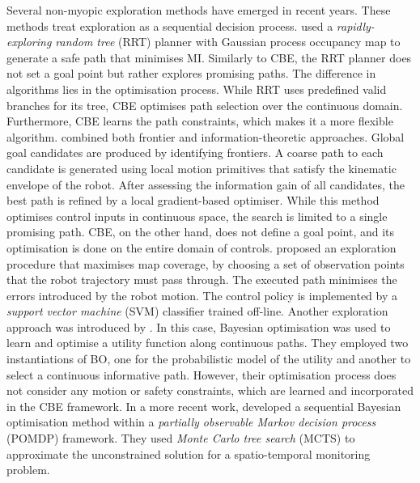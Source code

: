 \documentclass[shortAfour,sageh,times]{sagej_no_sage}
\begin{document}
Several non-myopic exploration methods have emerged in recent years. These methods treat exploration as a sequential decision process. 
\citet{Yang2013} used a \textit{rapidly-exploring random tree} (RRT) planner with Gaussian process occupancy map to generate a safe path that minimises 
MI. Similarly to CBE, the RRT planner does not set a goal point but rather explores promising paths. The difference in algorithms lies in the optimisation process. While RRT uses predefined valid branches for its tree, CBE optimises path selection over the continuous domain. Furthermore, CBE learns the path constraints, which makes it a more flexible algorithm. \citet{Charrow-RSS-15} combined both frontier and information-theoretic approaches. Global goal candidates are produced 
by identifying frontiers. A coarse path to each candidate is generated using local motion primitives that satisfy the kinematic envelope of 
the robot. After assessing the information gain of all candidates, the best path is refined by a local gradient-based optimiser. While this method optimises control inputs in continuous space, the search is limited to a single promising path. CBE, on the other hand, does not define a goal point, and its optimisation is done on the entire domain of controls. \citet{Kollar2008} proposed an exploration procedure that maximises map coverage, by choosing a set of observation points that the robot trajectory 
must pass through. The executed path minimises the errors introduced by the robot motion. The control policy is implemented by a \textit{support vector 
machine} (SVM) classifier trained off-line. Another exploration approach was introduced by \citet{Marchant2014}. In this case, Bayesian optimisation was used to learn and optimise a utility function along continuous paths. They employed two instantiations of BO, one for the probabilistic model of the utility and another to select a continuous informative path. However, their optimisation process does not consider any motion or safety constraints, which are learned and incorporated in the CBE framework. In a more recent work, \citet{Marchanta} developed a sequential Bayesian optimisation method within a \textit{partially observable Markov decision process} (POMDP) framework. They used \textit{Monte Carlo tree search} (MCTS) to approximate the unconstrained solution for a spatio-temporal monitoring problem. 
\end{document}
